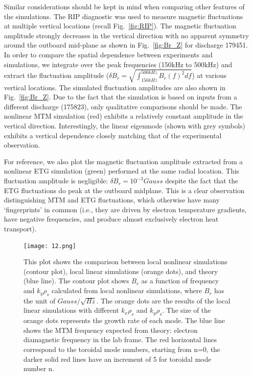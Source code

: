 \documentclass[
 aip,
 amsmath,amssymb,
 reprint
]{revtex4-1}
\begin{document}
Similar considerations should be kept in mind when comparing other features of the simulations.  The RIP diagnostic was used to measure magnetic fluctuations at multiple vertical locations (recall Fig.~\ref{fig:RIP}).  The magnetic fluctuation amplitude strongly decreases in the vertical direction with no apparent symmetry around the outboard mid-plane as shown in Fig.~\ref{fig:Br_Z} for discharge 179451.  In order to compare the spatial dependence between experiments and simulations, we integrate over the peak frequencies (150kHz to 500kHz)  and extract the fluctuation amplitude ($\delta B_r=\sqrt{\int^{500kHz}_{150kHz} B_r(f)^2 df}$) at various vertical locations.  The simulated fluctuation amplitudes are also shown in Fig.~\ref{fig:Br_Z}.  Due to the fact that the simulation is based on inputs from a different discharge (175823), only qualitative comparisons should be made.  The nonlinear MTM simulation (red) exhibits a relatively constant amplitude in the vertical direction.  Interestingly, the linear eigenmode (shown with grey symbols) exhibits a vertical dependence closely matching that of the experimental observation.     

For reference, we also plot the magnetic fluctuation amplitude extracted from a nonlinear ETG simulation (green) performed at the same radial location.  This fluctuation amplitude is negligible: $\delta B_r =10^{-3} Gauss$ despite the fact that the ETG fluctuations do peak at the outboard midplane. This is a clear observation distinguishing MTM and ETG fluctuations, which otherwise have many `fingerprints' in common (i.e., they are driven by electron temperature gradients, have negative frequencies, and produce almost exclusively electron heat transport).




\begin{figure}[ht]
        \texttt{[image: 12.png]}
        \centering
        \caption[font=5]{This plot shows the comparison between local nonlinear simulations (contour plot), local linear simulations (orange dots), and theory (blue line). The contour plot shows $B_r$ as a function of frequency and $k_y \rho_s$ calculated from local nonlinear simulations, where $B_r$ has the unit of $Gauss/\sqrt{Hz}$. The orange dots are the results of the local linear simulations with different $k_x\rho_s$ and $k_y\rho_s$. The size of the orange dots represents the growth rate of each mode. The blue line shows the MTM frequency expected from theory\cite{Kotschenreuther_2019}: electron diamagnetic frequency in the lab frame. 
        The red horizontal lines correspond to the toroidal mode numbers, starting from n=0, the darker solid red lines have an increment of 5 for toroidal mode number n. }
        \label{fig:NL_heat}
\end{figure}
\end{document}
